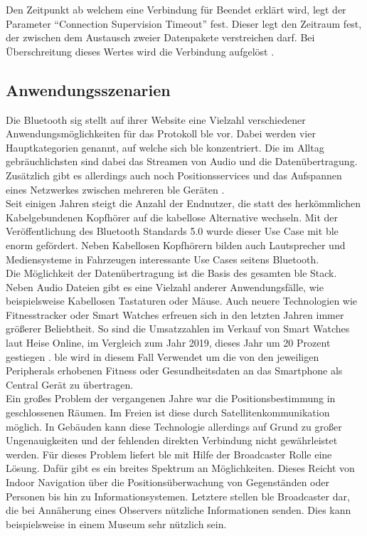 \noindent Den Zeitpunkt ab welchem eine Verbindung für Beendet erklärt wird, legt der Parameter "`Connection Supervision Timeout"' fest. Dieser legt den Zeitraum fest, der zwischen dem Austausch zweier Datenpakete verstreichen darf. Bei Überschreitung dieses Wertes wird die Verbindung aufgelöst \cite[Seite 22f]{Townsend14:GSB}.\\

\subsection{Anwendungsszenarien}
\label{ss:funktionsweise:anwendungen}

\noindent Die Bluetooth \ac{sig} stellt auf ihrer Website eine Vielzahl verschiedener Anwendungsmöglichkeiten für das Protokoll \ac{ble} vor. Dabei werden vier Hauptkategorien genannt, auf welche sich \ac{ble} konzentriert. Die im Alltag gebräuchlichsten sind dabei das Streamen von Audio und die Datenübertragung. Zusätzlich gibt es allerdings auch noch Positionsservices und das Aufspannen eines Netzwerkes zwischen mehreren \ac{ble} Geräten \cite{BLU:WWW}.\\

\noindent Seit einigen Jahren steigt die Anzahl der Endnutzer, die statt des herkömmlichen Kabelgebundenen Kopfhörer auf die kabellose Alternative wechseln. Mit der Veröffentlichung des Bluetooth Standards 5.0 wurde dieser Use Case mit \ac{ble} enorm gefördert. Neben Kabellosen Kopfhörern bilden auch Lautsprecher und Mediensysteme in Fahrzeugen interessante Use Cases seitens Bluetooth.\\

\noindent Die Möglichkeit der Datenübertragung ist die Basis des gesamten \ac{ble} Stack. Neben Audio Dateien gibt es eine Vielzahl anderer Anwendungsfälle, wie beispielsweise Kabellosen Tastaturen oder Mäuse. Auch neuere Technologien wie Fitnesstracker oder Smart Watches erfreuen sich in den letzten Jahren immer größerer Beliebtheit. So sind die Umsatzzahlen im Verkauf von Smart Watches laut Heise Online, im Vergleich zum Jahr 2019, dieses Jahr um 20 Prozent gestiegen \cite{HEI:WWW}. \ac{ble} wird in diesem Fall Verwendet um die von den jeweiligen Peripherals erhobenen Fitness oder Gesundheitsdaten an das Smartphone als Central Gerät zu übertragen.\\

\noindent Ein großes Problem der vergangenen Jahre war die Positionsbestimmung in geschlossenen Räumen. Im Freien ist diese durch Satellitenkommunikation möglich. In Gebäuden kann diese Technologie allerdings auf Grund zu großer Ungenauigkeiten und der fehlenden direkten Verbindung nicht gewährleistet werden. Für dieses Problem liefert \ac{ble} mit Hilfe der Broadcaster Rolle eine Lösung. Dafür gibt es ein breites Spektrum an Möglichkeiten. Dieses Reicht von Indoor Navigation über die Positionsüberwachung von Gegenständen oder Personen bis hin zu Informationsystemen. Letztere stellen \ac{ble} Broadcaster dar, die bei Annäherung eines Observers nützliche Informationen senden. Dies kann beispielsweise in einem Museum sehr nützlich sein.\\          

